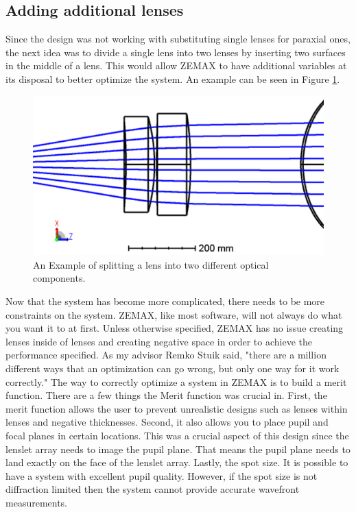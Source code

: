 \subsection{Adding additional lenses}
\label{sec:real_more_lens}

Since the design was not working with substituting single lenses for paraxial ones,
the next idea was to divide a single lens into two lenses by inserting two surfaces
in the middle of a lens.  This would allow ZEMAX to have additional variables at its
disposal to better optimize the system.  An example can be seen in Figure
\ref{fig:2x_lens}.


\begin{figure}[h!]
\centering
\includegraphics[width=12cm]{Figures/2x_L1.png}
\caption{An Example of splitting a lens into two different optical components.}
\label{fig:2x_lens}
\end{figure}

Now that the system has become more complicated, there needs to be more constraints
on the system.  ZEMAX, like most software, will not always do what you want it to at
first.  Unless otherwise specified, ZEMAX has no issue creating lenses inside of
lenses and creating negative space in order to achieve the performance specified. 
As my advisor Remko Stuik said, "there are a million different ways that an
optimization can go wrong, but only one way for it work correctly."  The way to
correctly optimize a system in ZEMAX is to build a merit function. There are a few
things the Merit function was crucial in.  First, the merit function allows the user
to prevent unrealistic designs such as lenses within lenses and negative
thicknesses.  Second, it also allows you to place pupil and focal planes in certain
locations.  This was a crucial aspect of this design since the lenslet array needs
to image the pupil plane.  That means the pupil plane needs to land exactly on the
face of the lenslet array.  Lastly, the spot size.  It is possible to have a system
with excellent pupil quality.  However, if the spot size is not diffraction limited
then the system cannot provide accurate wavefront measurements.


